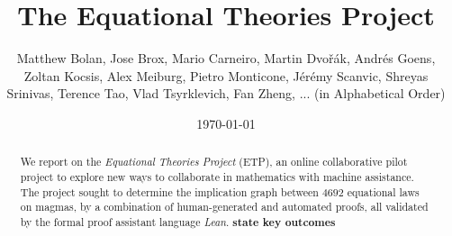 \documentclass[12pt]{amsart}
\title{The Equational Theories Project}
\author[Equational Theories Project]{Matthew Bolan, Jose Brox, Mario Carneiro, Martin Dvo\v{r}\'ak, Andr\'es Goens, Zoltan Kocsis, Alex Meiburg, Pietro Monticone, J\'er\'emy Scanvic, Shreyas Srinivas, Terence Tao, Vlad Tsyrklevich, Fan Zheng, ... (in Alphabetical Order)}
\date{\today}
\theoremstyle{definition}
\newcommand{\note}[1]{{\bf #1}}
\begin{document}
\begin{abstract}
  We report on the \emph{Equational Theories Project} (ETP), an online collaborative pilot project
  to explore new ways to collaborate in mathematics with machine assistance. The project sought to
  determine the implication graph between $4692$ equational laws on magmas, by a combination of
  human-generated and automated proofs, all validated by the formal proof assistant language
  \emph{Lean}. \note{state key outcomes}
\end{abstract}

\maketitle

\tableofcontents

















\appendix


% 




\end{document}
